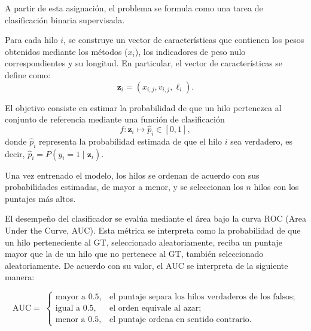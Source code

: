 \documentclass[11pt,a4paper]{article}
\begin{document}
A partir de esta asignación, el problema se formula como una tarea de clasificación binaria supervisada. 

Para cada hilo $i$, se construye un vector de características que contienen los pesos obtenidos mediante los métodos ($x_i$), los indicadores de peso nulo correspondientes y su longitud. En particular, el vector de características se define como: 
$$\mathbf{z}_i= \left(
x_{i,j},v_{i,j},
\ell_i
\right).
$$

El objetivo consiste en estimar la probabilidad de que un hilo pertenezca al conjunto de referencia mediante una función de clasificación 
$$f:\mathbf{z}_i\longmapsto\widehat{p}_i\in[0,1],$$ 
donde $\widehat{p}_i$ representa la probabilidad estimada de que el hilo $i$ sea verdadero, es decir, $\widehat{p}_i=P(y_i=1\mid\mathbf{z}_i).$

Una vez entrenado el modelo, los hilos se ordenan de acuerdo con sus probabilidades estimadas, de mayor a menor, y se seleccionan los $n$ hilos con los puntajes más altos.

El desempeño del clasificador se evalúa mediante el área bajo la curva ROC (Area Under the Curve, AUC). Esta métrica se interpreta como la probabilidad de que un hilo perteneciente al GT, seleccionado aleatoriamente, reciba un puntaje mayor que la de un hilo que no pertenece al GT, también seleccionado aleatoriamente. De acuerdo con su valor, el AUC se interpreta de la siguiente manera:



\[
  \mathrm{AUC}= \;
  \begin{cases}
    \text{mayor a } 0.5, & \text{el puntaje separa los hilos verdaderos de los falsos;}\\[2pt]
    \text{igual a } 0.5, & \text{el orden equivale al azar;}\\[2pt]
    \text{menor a } 0.5, & \text{el puntaje ordena en sentido contrario.}
  \end{cases}
\]
\end{document}
